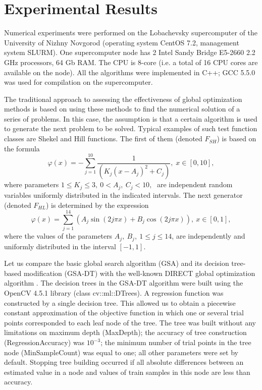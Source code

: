 \documentclass[entropy,article,submit,moreauthors,pdftex]{Definitions/mdpi}
\begin{document}
\section{Experimental Results}

Numerical experiments were performed on the Lobachevsky supercomputer of the University of Nizhny Novgorod (operating system CentOS 7.2, management system SLURM). One supercomputer node has 2 Intel Sandy Bridge E5-2660 2.2 GHz processors, 64 Gb RAM. The CPU is 8-core (i.e. a total of 16 CPU cores are available on the node). All the algorithms were implemented in C++; GCC 5.5.0 was used for compilation on the supercomputer.

The traditional approach to assessing the effectiveness of global optimization methods is based on using these methods to find the numerical solution of a series of problems. 
In this case, the assumption is that a certain algorithm is used to generate the next problem to be solved. 
Typical examples of such test function classes are Shekel and Hill functions. 
The first of them (denoted $F_{SH}$) is based on the formula
\begin{equation}\label{shekel}
  \varphi(x)=-\sum_{j=1}^{10}\frac{1}{(K_j(x-A_j)^2+C_j)},\;  x\in[0,10],
\end{equation}
where parameters $1\le K_j\le 3,\: 0 < A_j,\: C_j < 10, \;$ are independent random variables uniformly distributed in the indicated intervals. 
The next generator (denoted   $F_{HL}$) is determined by the expression
\begin{equation}\label{hill}
  \varphi(x)=\sum_{j=1}^{14}(A_j\sin(2j\pi x) + B_j\cos(2j\pi x)),\: x\in[0,1],
\end{equation}
where the values of the parameters $A_j,\: B_j,\: 1 \le j \le 14$, are independently and uniformly distributed in the interval  $[-1,1]$. 

Let us compare the basic global search algorithm (GSA) and its decision tree-based modification (GSA-DT) with the well-known DIRECT global optimization algorithm  \cite{Jones2009}.
The decision trees in the GSA-DT algorithm were built using the OpenCV 4.5.1 library (class cv::ml::DTrees). A regression function was constructed by a single decision tree. This allowed us to obtain a piecewise constant approximation of the objective function in which one or several trial points corresponded to each leaf node of the tree. 
The tree was built without any limitations on maximum depth (MaxDepth); the accuracy of tree construction (RegressionAccuracy) was $10^{-3}$; the minimum number of trial points in the tree node (MinSampleCount) was equal to one; all other parameters were set by default. Stopping tree building occurred if all absolute differences between an estimated value in a node and values of train samples in this node are less than accuracy.
\end{document}
